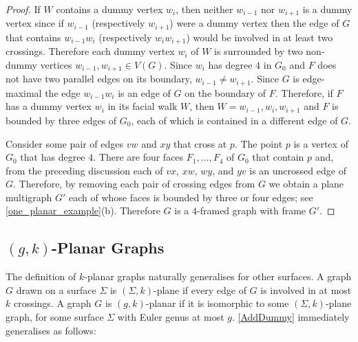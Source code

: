\documentclass{patmorin}
\theoremstyle{plain}
\theoremstyle{definition}
\DeclareMathOperator{\dist}{dist}
\renewcommand{\le}{\leqslant}
\begin{document}
\begin{proof}
If $W$ contains a dummy vertex $w_i$, then neither $w_{i-1}$ nor $w_{i+1}$ is a dummy vertex since if $w_{i-1}$ (respectively $w_{i+1}$) were a dummy vertex then the edge of $G$ that contains $w_{i-1}w_i$ (respectively $w_iw_{i+1}$) would be involved in at least two crossings.  Therefore each dummy vertex $w_i$ of $W$ is surrounded by two non-dummy vertices $w_{i-1},w_{i+1}\in V(G)$.  Since $w_i$ has degree $4$ in $G_0$ and $F$ does not have two parallel edges on its boundary, $w_{i-1}\neq w_{i+1}$.  Since $G$ is edge-maximal the edge $w_{i-1}w_i$ is an edge of $G$ on the boundary of $F$.  Therefore, if $F$ has a dummy vertex $w_i$ in its facial walk $W$, then $W=w_{i-1},w_i,w_{i+1}$ and $F$ is bounded by three edges of $G_0$, each of which is contained in a different edge of $G$.


Consider some pair of edges $vw$ and $xy$ that cross at $p$.  The point $p$ is a vertex of $G_0$ that has degree $4$.  There are four faces $F_1,\ldots,F_4$ of $G_0$ that contain $p$ and, from the preceding discussion each of $vx$, $xw$, $wy$, and $yv$ is an uncrossed edge of $G$.  Therefore, by removing each pair of crossing edges from $G$ we obtain a plane multigraph $G'$ each of whose faces is bounded by three or four edges; see \cref{one_planar_example}(b).  Therefore $G$ is a $4$-framed graph with frame $G'$.
\end{proof}

\subsection{\boldmath $(g,k)$-Planar Graphs}

The definition of $k$-planar graphs naturally generalises for other surfaces. A graph $G$ drawn on a surface $\Sigma$ is $(\Sigma,k)$-plane if every edge of $G$ is involved in at most $k$ crossings.  A graph $G$ is $(g,k)$-planar if it is isomorphic to some $(\Sigma,k)$-plane graph, for some surface $\Sigma$ with Euler genus at most $g$. \cref{AddDummy} immediately generalises as follows:
\end{document}
